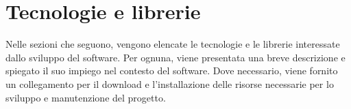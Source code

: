 \section{Tecnologie e librerie}

Nelle sezioni che seguono, vengono elencate le tecnologie e le librerie interessate dallo sviluppo del software. Per ognuna, viene presentata una breve descrizione e spiegato il suo impiego nel contesto del software. Dove necessario, viene fornito un collegamento per il download e l'installazione delle risorse necessarie per lo sviluppo e manutenzione del progetto.




















